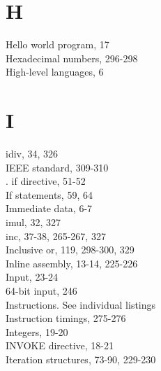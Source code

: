 \documentclass[10pt]{book}
\begin{document}
\section{H}
Hello world program, 17\\
Hexadecimal numbers, 296-298\\
High-level languages, 6

\section{I}
idiv, 34, 326\\
IEEE standard, 309-310\\
. if directive, 51-52\\
If statements, 59, 64\\
Immediate data, 6-7\\
imul, 32, 327\\
inc, 37-38, 265-267, 327\\
Inclusive or, 119, 298-300, 329\\
Inline assembly, 13-14, 225-226\\
Input, 23-24\\
64-bit input, 246\\
Instructions. See individual listings\\
Instruction timings, 275-276\\
Integers, 19-20\\
INVOKE directive, 18-21\\
Iteration structures, 73-90, 229-230
\end{document}
